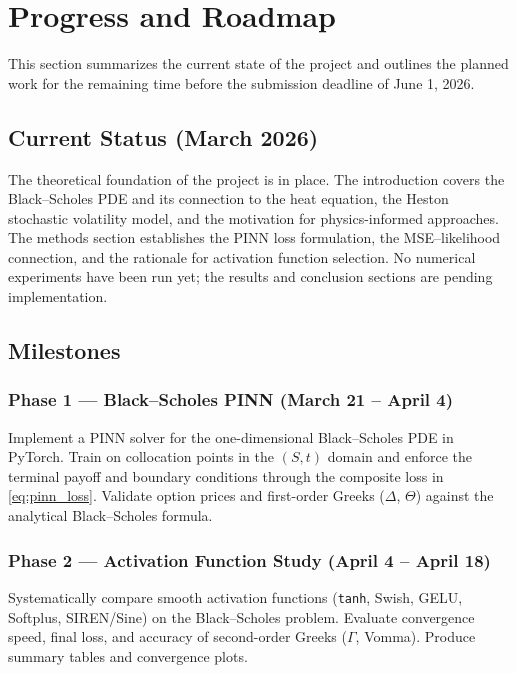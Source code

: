 \section{Progress and Roadmap}\label{section:roadmap}

This section summarizes the current state of the project and outlines the planned work for the remaining time before the submission deadline of June 1, 2026.

\subsection*{Current Status (March 2026)}

The theoretical foundation of the project is in place. The introduction covers the Black--Scholes PDE and its connection to the heat equation, the Heston stochastic volatility model, and the motivation for physics-informed approaches. The methods section establishes the PINN loss formulation, the MSE--likelihood connection, and the rationale for activation function selection. No numerical experiments have been run yet; the results and conclusion sections are pending implementation.

\subsection*{Milestones}

\subsubsection*{Phase 1 --- Black--Scholes PINN (March 21 -- April 4)}

Implement a PINN solver for the one-dimensional Black--Scholes PDE in PyTorch. Train on collocation points in the $(S,t)$ domain and enforce the terminal payoff and boundary conditions through the composite loss in \cref{eq:pinn_loss}. Validate option prices and first-order Greeks ($\Delta$, $\Theta$) against the analytical Black--Scholes formula.

\subsubsection*{Phase 2 --- Activation Function Study (April 4 -- April 18)}

Systematically compare smooth activation functions (\texttt{tanh}, Swish, GELU, Softplus, SIREN/Sine) on the Black--Scholes problem. Evaluate convergence speed, final loss, and accuracy of second-order Greeks ($\Gamma$, Vomma). Produce summary tables and convergence plots.

